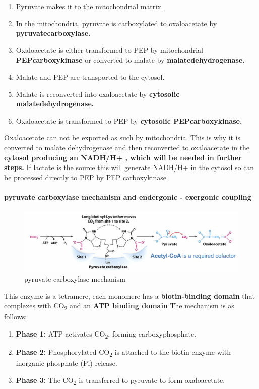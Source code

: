 \documentclass[../main.tex]{subfiles}
\begin{document}
\begin{enumerate}
    \item Pyruvate makes it to the mitochondrial matrix.
    \item In the mitochondria, pyruvate is carboxylated to oxaloacetate by \textbf{\gls{pyruvatecarboxylase}.}
    \item Oxaloacetate is either transformed to PEP by mitochondrial \textbf{\gls{PEPcarboxykinase} }or converted to malate by \textbf{\gls{malatedehydrogenase}.}
    \item Malate and PEP are transported to the cytosol.
    \item Malate is reconverted into oxaloacetate by \textbf{cytosolic \gls{malatedehydrogenase}.}
    \item Oxaloacetate is transformed to PEP by \textbf{cytosolic \gls{PEPcarboxykinase}.}
\end{enumerate}
\begin{remark}
    Oxaloacetate can not be exported as such by mitochondria. This is why it is converted to malate dehydrogenase and then reconverted to oxaloacetate in the \textbf{cytosol producing an NADH/H+ , which will be needed in further steps.} If lactate is the source this will generate NADH/H+ in the cytosol so can be processed directly to PEP by PEP carboxykinase
\end{remark}

\paragraph{pyruvate carboxylase mechanism and endergonic - exergonic coupling }
\begin{figure}[H]
    \centering
    \includegraphics[width=\linewidth]{pyruvateCarboxylase.png}
    \caption{pyruvate carboxylase mechanism}
    \label{fig:enter-label}
\end{figure}
This enzyme is a tetramere, each monomere has a\textbf{ biotin-binding domain} that complexes with CO\textsubscript{2}  and an \textbf{ATP binding domain} The mechanism is as follows:

\begin{enumerate}
    \item \textbf{Phase 1:} ATP activates CO\textsubscript{2}, forming carboxyphosphate.
    \item \textbf{Phase 2:} Phosphorylated CO\textsubscript{2} is attached to the biotin-enzyme with inorganic phosphate (Pi) release.
    \item \textbf{Phase 3:} The CO\textsubscript{2} is transferred to pyruvate to form oxaloacetate.
\end{enumerate}
\end{document}
